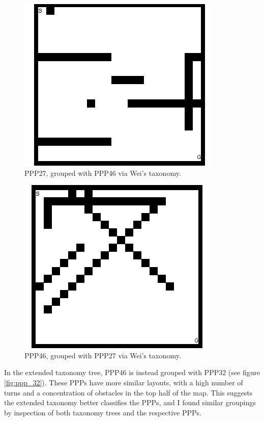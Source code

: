 \documentclass[authoryearcitations]{UoYCSproject}
\begin{document}
\begin{figure}[H]
\graphicspath{ {EvalPics/} }
\includegraphics[scale=0.65]{ppp27.png}
\caption{PPP27, grouped with PPP46 via Wei's taxonomy.}
\label{fig:ppp_27}
\end{figure}

\begin{figure}[H]
\graphicspath{ {EvalPics/} }
\includegraphics[scale=0.65]{ppp46.png}
\caption{PPP46, grouped with PPP27 via Wei's taxonomy.}
\label{fig:ppp_46}
\end{figure}

In the extended taxonomy tree, PPP46 is instead grouped with PPP32 (see figure \ref{fig:ppp_32}). These PPPs have more similar layouts, with a high number of turns and a concentration of obstacles in the top half of the map. This suggests the extended taxonomy better classifies the PPPs, and I found similar groupings by inspection of both taxonomy trees and the respective PPPs.
\end{document}
